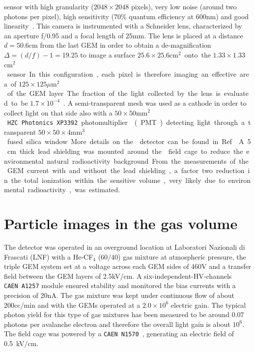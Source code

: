 \documentclass[12pt]{iopart}
\begin{document}
sensor with high granularity ($2048{\times}2048$ pixels), very low
noise (around two photons per pixel), high sensitivity (70\% quantum
efficiency at 600\unit{nm}) and good
linearity~\cite{bib:jinst_orange1}. This camera is instrumented with a
Schneider lens, characterized by an aperture f/0.95 and a focal length
of 25\unit{mm}. The lens is placed at a distance $d=50.6$\unit{cm}
from the last GEM in order to obtain a de-magnification $\Delta =
(d/f) - 1 = 19.25$ to image a surface $25.6{\times}25.6$\unit{cm$^2$}
onto the $1.33{\times}1.33$\unit{cm$^2$} sensor.  In this
configuration, each pixel is therefore imaging an effective area of
$125{\times}125$\unit{$\mu$m$^2$} of the GEM layer. The fraction of
the light collected by the lens is evaluated
to be $1.7{\times}10^{-4}$~\cite{bib:jinst_orange1}.
%
A semi-transparent mesh was used as a cathode in order to collect
light on that side also with a $50{\times}50$\unit{mm$^2$}
\texttt{HZC~Photonics~XP3392} photomultiplier~\cite{PMTPhotonics}
(PMT) detecting light through a transparent
$50{\times}50{\times}4$\unit{mm$^3$} fused silica window. More details
on the \lemon detector can be found in Ref.~\cite{paperBTF}.

A 5\unit{cm} thick lead shielding was mounted around the \lemon field
cage to reduce the environmental natural radioactivity
background. From the measurements of the GEM current with and without
the lead shielding, a factor two reduction in the total ionization
within the sensitive volume, very likely due to environmental
radioactivity, was estimated.


\section{Particle images in the \lemon gas volume}

The \lemon detector was operated in an overground location at
Laboratori Nazionali di Frascati (LNF) with a He-CF$_4$ (60/40) gas
mixture at atmospheric pressure, the triple GEM system set at a
voltage across each GEM sides of 460\unit{V} and a transfer field
between the GEM layers of 2.5\unit{kV/cm}. A
six-independent-HV-channels \texttt{CAEN~A1257} module
ensured stability and monitored the bias currents with a precision of
20\unit{nA}. The gas mixture was kept under continuous flow of about
200\unit{cc/min} and with the GEMs operated at a $2.0\times10^6$
electric gain. The typical photon yield for this type of gas mixtures
has been measured to be around 0.07 photons per avalanche
electron\cite{bib:jinst_orange1, bib:roby, bib:tesinatalia} and
therefore the overall light gain is about $10^6$. The field cage was
powered by a \texttt{CAEN~N1570}~\cite{CAENN1570}, generating an
electric field of 0.5~kV/cm.
  
\end{document}
